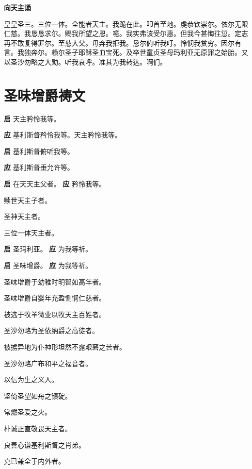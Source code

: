 \documentclass[UTF8,17pt]{ctexart}
\begin{document}
\textbf{向天主诵}

皇皇圣三。三位⼀体。全能者天主。我跪在此。叩⾸⾄地。虔恭钦崇尔。依尔⽆限仁慈。我恳恳求尔。赐我所望之恩。噫。我实弗该受尔惠。但我今甚悔往愆。定志再不敢复得罪尔。⾄慈⼤⽗。⽏弃我拒我。恳尔俯听我吁。怜悯我贫穷。因尔有⾔。我独奔尔。赖尔圣⼦耶稣圣⾎宝死。及卒世童贞圣母玛利亚⽆原罪之始胎。又以圣沙勿略之⼤勋。听我哀呼。准其为我转达。啊们。

\section{圣味增爵祷⽂}

\textbf{启} \quad 天主矜怜我等。

\textbf{应} \quad 基利斯督矜怜我等。天主矜怜我等。

\textbf{启} \quad 基利斯督俯听我等。

\textbf{应} \quad 基利斯督垂允许等。

\textbf{启} \quad 在天天主⽗者。 \hfill \textbf{应} \quad 矜怜我等。

 赎世天主⼦者。

 圣神天主者。

 三位⼀体天主者。

\textbf{启} \quad 圣玛利亚。 \hfill \textbf{应} \quad 为我等祈。

\textbf{启} \quad 圣味增爵。 \hfill \textbf{应} \quad 为我等祈。

 圣味增爵于幼稚时明智如⾼年者。

 圣味增爵⾃婴年充盈恻悯仁慈者。

 被选于牧⽺微业以牧天主百姓者。

 圣沙勿略为圣依纳爵之⾼徒者。

 被掳异地为仆神形坦然不露艰窘之苦者。

 圣沙勿略⼴布和平之福⾳者。

 以信为⽣之义⼈。

 坚倚圣望如⾈之镇碇。

 常燃圣爱之⽕。

 朴诚正直敬畏天主者。

 良善⼼谦基利斯督之肖弟。

 克已兼全于内外者。
\end{document}
